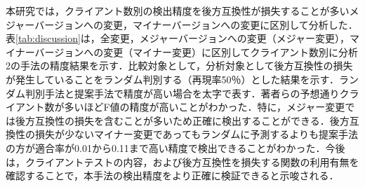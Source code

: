 \documentclass[submit]{ipsj}
\begin{document}
{本研究では，クライアント数別の検出精度を後方互換性が損失することが多いメジャーバージョンへの変更，マイナーバージョンへの変更に区別して分析した．
表\ref{tab:discussion}は，全変更，メジャーバージョンへの変更（メジャー変更），マイナーバージョンへの変更（マイナー変更）に区別してクライアント数別に分析2の手法の精度結果を示す．比較対象として，分析対象として後方互換性の損失が発生していることをランダム判別する（再現率50％）とした結果を示す．ランダム判別手法と提案手法で精度が高い場合を太字で表す．著者らの予想通りクライアント数が多いほどF値の精度が高いことがわかった．特に，メジャー変更では後方互換性の損失を含むことが多いため正確に検出することができる．後方互換性の損失が少ないマイナー変更であってもランダムに予測するよりも提案手法の方が適合率が0.01から0.11まで高い精度で検出できることがわかった．今後は，クライアントテストの内容，および後方互換性を損失する関数の利用有無を確認することで，本手法の検出精度をより正確に検証できると示唆される．

}
\end{document}
